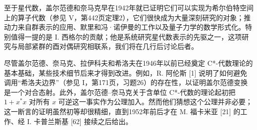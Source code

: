 至于星代数，盖尔范德和奈马克早在1942年就已证明它们可以实现为希尔伯特空间上的算子代数（参见 V，第442页定理2），它们很快成为大量深刻研究的对象；推动力来自群表示的应用、默里和冯·诺伊曼的工作以及量子力学的数学形式化。特别值得一提的是 I. 西格尔的贡献；他是系统研究星代数表示的先驱之一，这项研究与局部紧群的酉对偶研究相联系，我们将在几行后讨论后者。

尽管盖尔范德、奈马克、拉伊科夫和希洛夫在1946年以前已经奠定 C*-代数理论的基本基础，某些技术细节后来才得到改进。例如，R. 阿伦斯 {[}1{]} 说明了如何避免调用“希洛夫边界”（参见 I，第171页，习题26）的存在性，以证明盖尔范德变换是一个对合态射。此外，盖尔范德--奈马克关于含单位 C*-代数的理论起初把 \(1 + x^{*}x\) 对所有 \(x\) 可逆这一事实作为公理加入。然而他们猜想这个公理并非必要；这一断言的证明虽然初等却很精细，直到1952年前后才在 M. 福卡米亚 {[}21{]} 的工作、经 I. 卡普兰斯基 {[}62{]} 接续之后给出。

